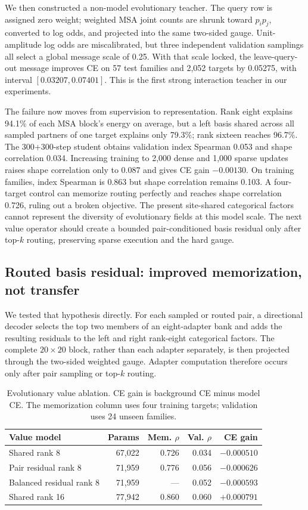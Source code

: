 \documentclass[10pt]{article}
\begin{document}
We then constructed a non-model evolutionary teacher.  The query row is assigned zero weight;
weighted MSA joint counts are shrunk toward $p_i p_j$, converted to log odds, and projected into
the same two-sided gauge.  Unit-amplitude log odds are miscalibrated, but three independent
validation samplings all select a global message scale of 0.25.  With that scale locked, the
leave-query-out message improves CE on 57 test families and 2,052 targets by 0.05275, with
interval $[0.03207,0.07401]$.  This is the first strong interaction teacher in our experiments.

The failure now moves from supervision to representation.  Rank eight explains 94.1\% of each
MSA block's energy on average, but a left basis shared across all sampled partners of one target
explains only 79.3\%; rank sixteen reaches 96.7\%.  The 300+300-step student obtains validation
index Spearman 0.053 and shape correlation 0.034.  Increasing training to 2,000 dense and 1,000
sparse updates raises shape correlation only to 0.087 and gives CE gain $-0.00130$.  On training
families, index Spearman is 0.863 but shape correlation remains 0.103.  A four-target control can
memorize routing perfectly and reaches shape correlation 0.726, ruling out a broken objective.
The present site-shared categorical factors cannot represent the diversity of evolutionary
fields at this model scale.  The next value operator should create a bounded pair-conditioned
basis residual only after top-$k$ routing, preserving sparse execution and the hard gauge.

\subsection{Routed basis residual: improved memorization, not transfer}

We tested that hypothesis directly.  For each sampled or routed pair, a directional decoder
selects the top two members of an eight-adapter bank and adds the resulting residuals to the
left and right rank-eight categorical factors.  The complete $20\times20$ block, rather than
each adapter separately, is then projected through the two-sided weighted gauge.  Adapter
computation therefore occurs only after pair sampling or top-$k$ routing.

\begin{table}[t]
\centering
\caption{Evolutionary value ablation.  CE gain is background CE minus model CE.  The
memorization column uses four training targets; validation uses 24 unseen families.}
\small
\begin{tabular}{lrrrr}
\toprule
Value model & Params & Mem. $\rho$ & Val. $\rho$ & CE gain \\
\midrule
Shared rank 8 & 67,022 & 0.726 & 0.034 & $-0.000510$ \\
Pair residual rank 8 & 71,959 & 0.776 & 0.056 & $-0.000626$ \\
Balanced residual rank 8 & 71,959 & --- & 0.052 & $-0.000593$ \\
Shared rank 16 & 77,942 & 0.860 & 0.060 & $+0.000791$ \\
\bottomrule
\end{tabular}
\label{tab:pair-basis}
\end{table}
\end{document}
